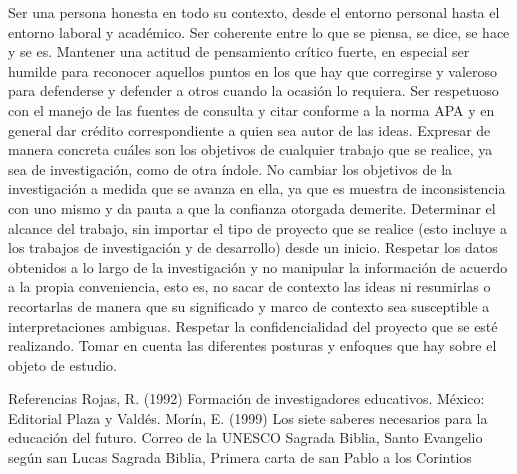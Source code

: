 Ser una persona honesta en todo su contexto, desde el entorno personal hasta el entorno laboral y académico.
Ser coherente entre lo que se piensa, se dice, se hace y se es.
Mantener una actitud de pensamiento crítico fuerte, en especial ser humilde para reconocer aquellos puntos en los que hay que corregirse y valeroso para defenderse y defender a otros cuando la ocasión lo requiera.
Ser respetuoso con el manejo de las fuentes de consulta y citar conforme a la norma APA y en general dar crédito correspondiente a quien sea autor de las ideas.
Expresar de manera concreta cuáles son los objetivos de cualquier trabajo que se realice, ya sea de investigación, como de otra índole.
No cambiar los objetivos de la investigación a medida que se avanza en ella, ya que es muestra de inconsistencia con uno mismo y da pauta a que la confianza otorgada demerite.
Determinar el alcance del trabajo, sin importar el tipo de proyecto que se realice (esto incluye a los trabajos de investigación y de desarrollo) desde un inicio.
Respetar los datos obtenidos a lo largo de la investigación y no manipular la información de acuerdo a la propia conveniencia, esto es, no sacar de contexto las ideas ni resumirlas o recortarlas de manera que su significado y marco de contexto sea susceptible a interpretaciones ambiguas.
Respetar la confidencialidad del proyecto que se esté realizando.
Tomar en cuenta las diferentes posturas y enfoques que hay sobre el objeto de estudio.

Referencias
Rojas, R. (1992) Formación de investigadores educativos. México: Editorial Plaza y Valdés.
Morín, E. (1999) Los siete saberes necesarios para la educación del futuro. Correo de la UNESCO
Sagrada Biblia, Santo Evangelio según san Lucas
Sagrada Biblia, Primera carta de san Pablo a los Corintios